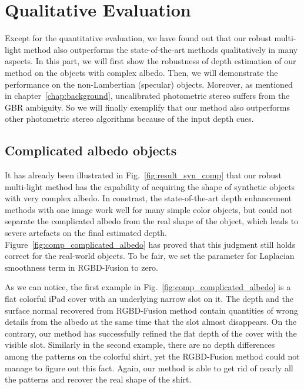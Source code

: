 \section{Qualitative Evaluation}
Except for the quantitative evaluation, we have found out that our robust multi-light method also outperforms the state-of-the-art methods qualitatively in many aspects.
In this part, we will first show the robustness of depth estimation of our method on the objects with complex albedo.
Then, we will demonstrate the performance on the non-Lambertian (specular) objects.
Moreover, as mentioned in chapter~\ref{chap:background}, uncalibrated photometric stereo suffers from the GBR ambiguity.
So we will finally exemplify that our method also outperforms other photometric stereo algorithms because of the input depth cues.

\subsection{Complicated albedo objects}
It has already been illustrated in Fig.~\ref{fig:result_syn_comp} that our robust multi-light method has the capability of acquiring the shape of synthetic objects with very complex albedo.
In constrast, the state-of-the-art depth enhancement methods with one image work well for many simple color objects, but could not separate the complicated albedo from the real shape of the object, which leads to severe artefacts on the final estimated depth. 
Figure~\ref{fig:comp_complicated_albedo} has proved that this judgment still holds correct for the real-world objects.
To be fair, we set the parameter for Laplacian smoothness term in RGBD-Fusion to zero.

As we can notice, the first example in Fig.~\ref{fig:comp_complicated_albedo} is a flat colorful iPad cover with an underlying narrow slot on it.
The depth and the surface normal recovered from RGBD-Fusion method contain quantities of wrong details from the albedo at the same time that the slot almost disappears.
On the contrary, our method has successfully refined the flat depth of the cover with the visible slot.
Similarly in the second example, there are no depth differences among the patterns on the colorful shirt, yet the RGBD-Fusion method could not manage to figure out this fact.
Again, our method is able to get rid of nearly all the patterns and recover the real shape of the shirt. 

